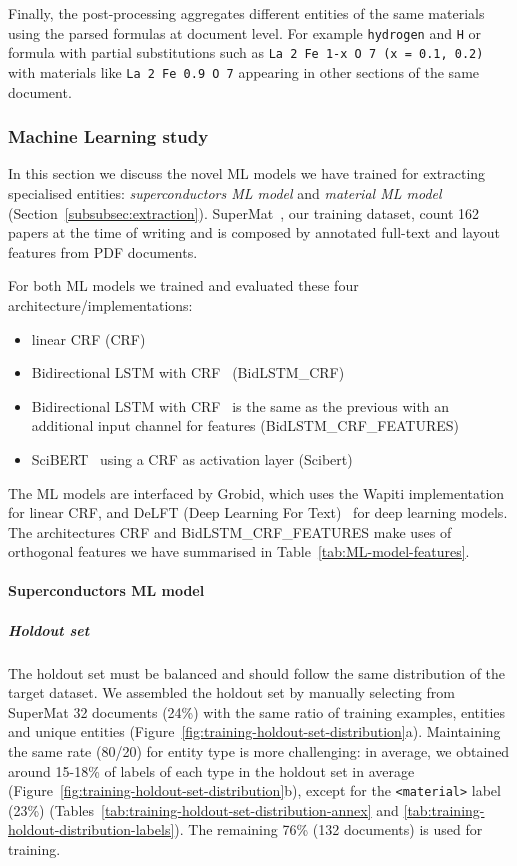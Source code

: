 \documentclass{article}
\begin{document}
Finally, the post-processing aggregates different entities of the same materials using the parsed formulas at document level. 
For example \texttt{hydrogen} and \texttt{H} or formula with partial substitutions such as \texttt{La 2 Fe 1-x O 7 (x = 0.1, 0.2)} with materials like \texttt{La 2 Fe 0.9 O 7} appearing in other sections of the same document. 

\subsubsection{Machine Learning study}

In this section we discuss the novel ML models we have trained for extracting specialised entities: \textit{superconductors ML model} and \textit{material ML model} (Section~\ref{subsubsec:extraction}). 
SuperMat~\cite{foppiano2021supermat}, our training dataset, count 162 papers at the time of writing and is composed by annotated full-text and layout features from PDF documents. 

For both ML models we trained and evaluated these four architecture/implementations: 
\begin{itemize}
    \item linear CRF (CRF)
    \item Bidirectional LSTM with CRF~\cite{Lample2016NeuralAF} (BidLSTM\_CRF)
    \item Bidirectional LSTM with CRF~\cite{Lample2016NeuralAF} is the same as the previous with an additional input channel for features (BidLSTM\_CRF\_FEATURES)
    \item SciBERT~\cite{Beltagy2019SciBERT} using a CRF as activation layer (Scibert)
\end{itemize}

The ML models are interfaced by Grobid, which uses the Wapiti\cite{lavergne2010practical} implementation for linear CRF, and DeLFT (Deep Learning For Text)~\cite{DeLFT} for deep learning models.
The architectures CRF and BidLSTM\_CRF\_FEATURES make uses of orthogonal features we have summarised in Table~\ref{tab:ML-model-features}. 

\paragraph{Superconductors ML model}

\subparagraph{Holdout set}
The holdout set must be balanced and should follow the same distribution of the target dataset. 
We assembled the holdout set by manually selecting from SuperMat 32 documents (24\%) with the same ratio of training examples, entities and unique entities (Figure~\ref{fig:training-holdout-set-distribution}a).
Maintaining the same rate (80/20) for entity type is more challenging: in average, we obtained around 15-18\% of labels of each type in the holdout set in average (Figure~\ref{fig:training-holdout-set-distribution}b), except for the \texttt{<material>} label (23\%) (Tables~\ref{tab:training-holdout-set-distribution-annex} and \ref{tab:training-holdout-distribution-labels}). 
The remaining 76\% (132 documents) is used for training. 
\end{document}
